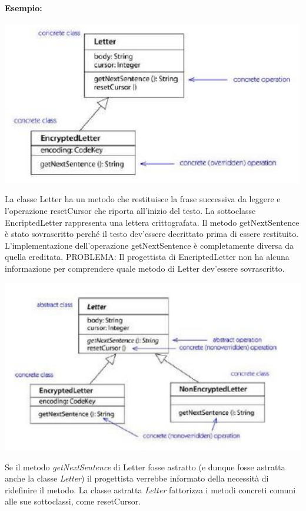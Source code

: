 \documentclass{article}
\begin{document}
	\paragraph*{Esempio:}
	\begin{center}
		\includegraphics[scale=0.7]{assets/classi_astratte_esempio.png}
	\end{center}
	La classe Letter ha un metodo che restituisce la frase successiva da leggere e l'operazione resetCursor che riporta all'inizio del testo. La sottoclasse EncriptedLetter rappresenta una lettera crittografata. Il metodo getNextSentence è stato sovrascritto perché il testo dev'essere decrittato prima di essere restituito. L'implementazione dell'operazione getNextSentence è completamente diversa da quella ereditata. PROBLEMA: Il progettista di EncriptedLetter non ha alcuna informazione per comprendere quale metodo di Letter dev'essere sovrascritto.
	\begin{center}
		\includegraphics[scale=0.7]{assets/classi_astratte_esempio_update.png}
	\end{center}
	Se il metodo \textit{getNextSentence} di Letter fosse astratto (e dunque fosse astratta anche la classe \textit{Letter}) il progettista verrebbe informato della necessità di ridefinire il metodo. La classe astratta \textit{Letter} fattorizza i metodi concreti comuni alle sue sottoclassi, come resetCursor.
\end{document}
